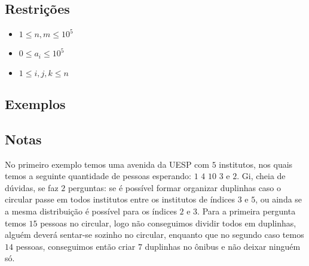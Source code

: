 
\subsection*{Restrições}
\begin{itemize}
	\item $1 \leq n, m \leq 10^5$
	\item $0 \leq a_i \leq 10^5$
	\item $1 \leq i, j, k \leq n$
\end{itemize}

\subsection*{Exemplos}


\subsection*{Notas}
No primeiro exemplo temos uma avenida da UESP com $5$ institutos, nos quais temos a seguinte quantidade de pessoas esperando: $1$ $4$ $10$ $3$ e $2$. Gi, cheia de dúvidas, se faz $2$ perguntas: se é possível formar organizar duplinhas caso o circular passe em todos institutos entre os institutos de índices $3$ e $5$, ou ainda se a mesma distribuição é possível para os índices $2$ e $3$. Para a primeira pergunta temos $15$ pessoas no circular, logo não conseguimos dividir todos em duplinhas, alguém deverá sentar-se sozinho no circular, enquanto que no segundo caso temos $14$ pessoas, conseguimos então criar $7$ duplinhas no ônibus e não deixar ninguém só.

